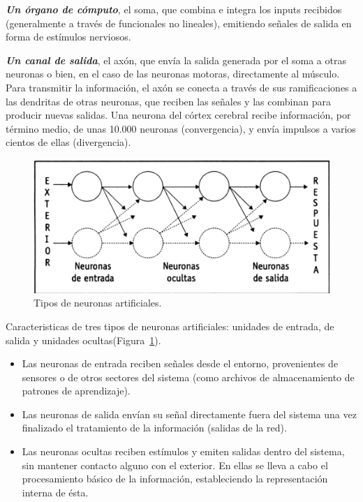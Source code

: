 \textbf{\textit{Un órgano de cómputo}}, el soma, que combina e integra los inputs recibidos (generalmente a través de funcionales no lineales), emitiendo señales de salida en forma de estímulos nerviosos\cite{sanchez2015maquinas}.

\textbf{\textit{Un canal de salida}}, el axón, que envía la salida generada por el soma a
otras neuronas o bien, en el caso de las neuronas motoras, directamente al
músculo. Para transmitir la información, el axón se conecta a través de sus ramificaciones a las dendritas de otras neuronas, que reciben las señales y las combinan para producir nuevas salidas. Una neurona del córtex cerebral recibe información, por término medio, de unas 10.000 neuronas (convergencia), y envía impulsos a varios cientos de ellas (divergencia)\cite{sanchez2015maquinas}.

\begin{figure}[H]
  \begin{center}
    \includegraphics[scale=0.90]{./tipo_neuronas.png}
    \caption{Tipos de neuronas artificiales\cite{lopez2008redes}.}
    \label{fig:tipo}
  \end{center}
\end{figure}

Caracteristicas de tres tipos de neuronas artificiales:
unidades de entrada, de salida y unidades ocultas(Figura~\ref{fig:tipo})\cite{lopez2008redes}.

\begin{itemize}
\item  Las neuronas de entrada reciben señales desde el entorno, provenientes de sensores o de otros sectores del sistema (como archivos de almacenamiento de patrones de aprendizaje).

\item Las neuronas de salida envían su señal directamente fuera del sistema una vez finalizado el tratamiento de la información (salidas de la red).

\item Las neuronas ocultas reciben estímulos y emiten salidas dentro del sistema, sin mantener contacto alguno con el exterior. En ellas se lleva a cabo el procesamiento básico de la información, estableciendo la representación
interna de ésta.
\end{itemize}

